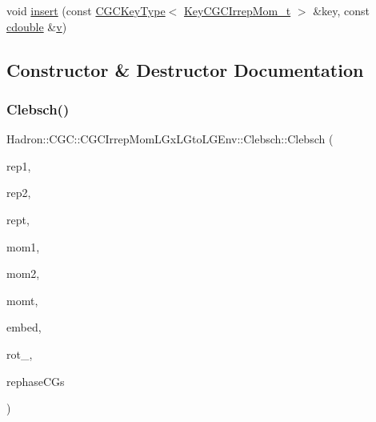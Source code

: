 \begin{DoxyCompactItemize}
\item 
void \mbox{\hyperlink{classHadron_1_1CGC_1_1CGCIrrepMomLGxLGtoLGEnv_1_1Clebsch_a4d4ec2ede98509ab49ac04fe23ef2ea8}{insert}} (const \mbox{\hyperlink{structHadron_1_1CGCKeyType}{C\+G\+C\+Key\+Type}}$<$ \mbox{\hyperlink{structHadron_1_1KeyCGCIrrepMom__t}{Key\+C\+G\+C\+Irrep\+Mom\+\_\+t}} $>$ \&key, const \mbox{\hyperlink{namespaceHadron_1_1CGC_a52d2b70e6792726fb525eab94daae53b}{cdouble}} \&\mbox{\hyperlink{adat__devel_2lib_2hadron_2hadron__timeslice_8cc_a716fc87f5e814be3ceee2405ed6ff22a}{v}})
\end{DoxyCompactItemize}


\subsection{Constructor \& Destructor Documentation}
\mbox{\label{classHadron_1_1CGC_1_1CGCIrrepMomLGxLGtoLGEnv_1_1Clebsch_aec8b07c8384bf303329f17cac780ba25}} 
\subsubsection{\texorpdfstring{Clebsch()}{Clebsch()}\hspace{0.1cm}{\footnotesize\ttfamily [1/2]}}
{\footnotesize\ttfamily Hadron\+::\+C\+G\+C\+::\+C\+G\+C\+Irrep\+Mom\+L\+Gx\+L\+Gto\+L\+G\+Env\+::\+Clebsch\+::\+Clebsch (\begin{DoxyParamCaption}\item[{const std\+::string \&}]{rep1,  }\item[{const std\+::string \&}]{rep2,  }\item[{const std\+::string \&}]{rept,  }\item[{const Array\+Int \&}]{mom1,  }\item[{const Array\+Int \&}]{mom2,  }\item[{const Array\+Int \&}]{momt,  }\item[{int}]{embed,  }\item[{const std\+::vector$<$ \mbox{\hyperlink{structHadron_1_1RotateVec__t}{Rotate\+Vec\+\_\+t}} $>$ \&}]{rot\+\_\+,  }\item[{bool}]{rephase\+C\+Gs }\end{DoxyParamCaption})\hspace{0.3cm}{\ttfamily [inline]}}

